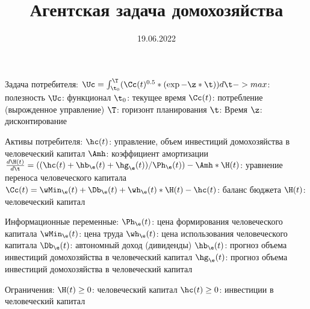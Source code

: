 \documentclass[12pt]{article}
\title{Агентская задача домохозяйства}
\date{19.06.2022}
\begin{document}
Задача потребителя:
    $\Uc = \int_{\t_{0}}^\T (\Cc(t)^{0.5}*(\exp{-\z*\t}))d\t -> max$: полезность
    $\Uc$: функционал
    $\t_{0}$: текущее время
    $\Cc(t)$: потребление (вырожденное управление)
    $\T$: горизонт планирования
    $\t$: Время
    $\z$: дисконтирование

Активы потребителя:
    $\hc(t)$: управление, объем инвестиций домохозяйства в человеческий капитал
    $\Amh$: коэффициент амортизации
    $\frac{d\H(t)}{d\t} = ((\hc(t)+\hb_{\e}(t)+\hg_{\e}(t))/\Ph_{\e}(t))-\Amh*\H(t)$: уравнение переноса человеческого капитала
    $\Cc(t) = \wMin_{\e}(t)+\Db_{\e}(t)+\wh_{\e}(t)*\H(t)-\hc(t)$: баланс бюджета
    $\H(t)$: человеческий капитал

Информационные переменные:
    $\Ph_{\e}(t)$: цена формирования человеческого капитала
    $\wMin_{\e}(t)$: цена труда
    $\wh_{\e}(t)$: цена использования человеческого капитала
    $\Db_{\e}(t)$: автономный доход (дивиденды)
    $\hb_{\e}(t)$: прогноз объема инвестиций домохозяйства в человеческий капитал
    $\hg_{\e}(t)$: прогноз объема инвестиций домохозяйства в человеческий капитал

Ограничения:
    $\H(t)\geq 0$: человеческий капитал
    $\hc(t)\geq 0$: инвестиции в человеческий капитал
\end{document}
